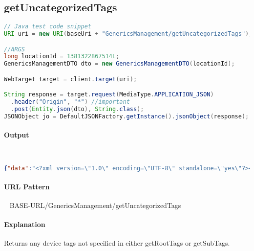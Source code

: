 \documentclass[
10pt, %
letterpaper, %
oneside, %
headinclude,footinclude, %
BCOR5mm, %
]{scrartcl}
\begin{document}

\subsection{\textbf{getUncategorizedTags}}

\begin{lstlisting}[language=Java]
// Java test code snippet
URI uri = new URI(baseUri + "GenericsManagement/getUncategorizedTags");

//ARGS
long locationId = 1381322867514L;
GenericsManagementDTO dto = new GenericsManagementDTO(locationId); 

WebTarget target = client.target(uri);

String response = target.request(MediaType.APPLICATION_JSON)
  .header("Origin", "*") //important
  .post(Entity.json(dto), String.class);
JSONObject jo = DefaultJSONFactory.getInstance().jsonObject(response);
\end{lstlisting}

\paragraph{Output}~
\begin{lstlisting}[language=json]
 {"data":"<?xml version=\"1.0\" encoding=\"UTF-8\" standalone=\"yes\"?><deviceTag id=\"0\" name=\"Uncategorized\" locationId=\"24\"><deviceNode idref=\"1381322858725\" name=\"0x11E00009A/A\" isRef=\"true\"/><deviceNode idref=\"1381322866050\" name=\"0x11E0000C3/A\" isRef=\"true\"/><deviceNode idref=\"1381322865941\" name=\"0x11E0000C7/A\" isRef=\"true\"/><deviceNode idref=\"1381322865840\" name=\"0x11E0000C8/A\" isRef=\"true\"/><deviceNode idref=\"1381322858979\" name=\"0x11E000131/A\" isRef=\"true\"/><deviceNode idref=\"1381322859106\" name=\"0x11E00019C/A\" isRef=\"true\"/><deviceNode idref=\"1381322856258\" name=\"0x120000000/A\" isRef=\"true\"/><deviceNode....}
\end{lstlisting}


\paragraph{URL Pattern} 
~\newline
BASE-URL/GenericsManagement/getUncategorizedTags

\paragraph{Explanation} Returns any device tags not specified in either getRootTags or getSubTags.
\end{document}
